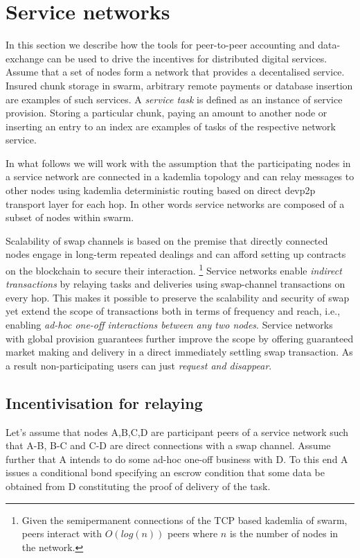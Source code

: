 \documentclass[a4paper,10pt]{article}
\newcommand\gloss[1]{\emph{\gls{#1}}}
\begin{document}
\section{Service networks}

In this section we describe how the tools for peer-to-peer accounting and data-exchange can
be used to drive the incentives for distributed digital services.
Assume that a set of nodes form a network that provides a decentalised service.
Insured chunk storage in swarm, arbitrary remote payments or database insertion are examples of such services.
A \gloss{service task} is defined as an instance of service provision. Storing a particular chunk, paying
an amount to another node or inserting an entry to an index are examples of tasks of the respective network
service.

In what follows we will work with the assumption that the participating nodes in a service network are
connected in a kademlia topology and can relay messages to other nodes using kademlia deterministic routing
based on direct devp2p transport layer for each hop. In other words service networks are composed of a subset
of nodes within swarm.

Scalability of
swap channels is based on the premise that directly connected nodes engage in long-term repeated
dealings and can afford setting up contracts on the blockchain to secure their interaction.%
%
\footnote{Given the semipermanent connections of the TCP based kademlia of swarm, peers interact with
$O(log(n))$ peers where $n$ is the number of nodes in the network.}
%
Service networks enable \gloss{indirect transactions} by relaying tasks and deliveries using
swap-channel transactions on every hop.
This makes it possible to preserve the scalability and security
of swap yet extend the scope of transactions both in terms of
frequency and reach, i.e., enabling \emph{ad-hoc one-off interactions between any two nodes}.
Service networks with global provision guarantees further improve the scope by
offering guaranteed market making and delivery in a direct immediately settling
swap transaction. As a result non-participating users can just \emph{request and disappear}.

\subsection{Incentivisation for relaying}

Let's assume that nodes A,B,C,D are participant peers of a service network such that
A-B, B-C and C-D are direct connections with a swap channel.
Assume further that A intends to do some ad-hoc one-off business with D. To this end
 A issues a conditional bond specifying an escrow
condition that some data be obtained from D constituting the proof of delivery of the task.
\end{document}

